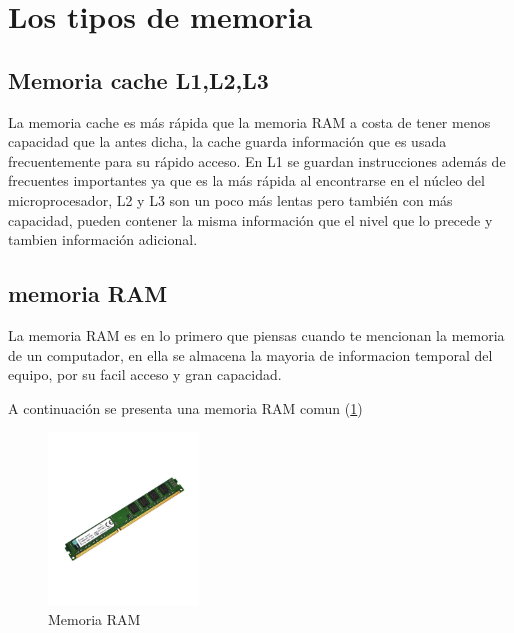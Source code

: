 \documentclass{article}
\begin{document}
 \vspace{0.4cm}

\section{Los tipos de memoria} 

\vspace{0.3cm}

\subsection{Memoria cache L1,L2,L3}

La memoria cache es más rápida que la memoria RAM a costa de tener menos capacidad que la antes dicha, la cache guarda información que es usada frecuentemente para su rápido acceso. En L1 se guardan instrucciones además de frecuentes importantes ya que es la más rápida al encontrarse en el núcleo del microprocesador, L2 y L3 son un poco más lentas pero también con más capacidad, pueden contener la misma información que el nivel que lo precede y tambien información adicional.

\vspace{0.3cm}

\subsection{memoria RAM}

La memoria RAM es en lo primero que piensas cuando te mencionan la memoria de un computador, en ella se almacena la mayoria de informacion temporal del equipo, por su facil acceso y gran capacidad.

\vspace{0.6cm}

A continuación se presenta una memoria RAM comun (\ref{fig:RAM})

\begin{figure}[h]
\includegraphics[width=4cm]{RAM.jpg}
\centering
\caption{Memoria RAM}
\label{fig:RAM}
\end{figure}
\end{document}
